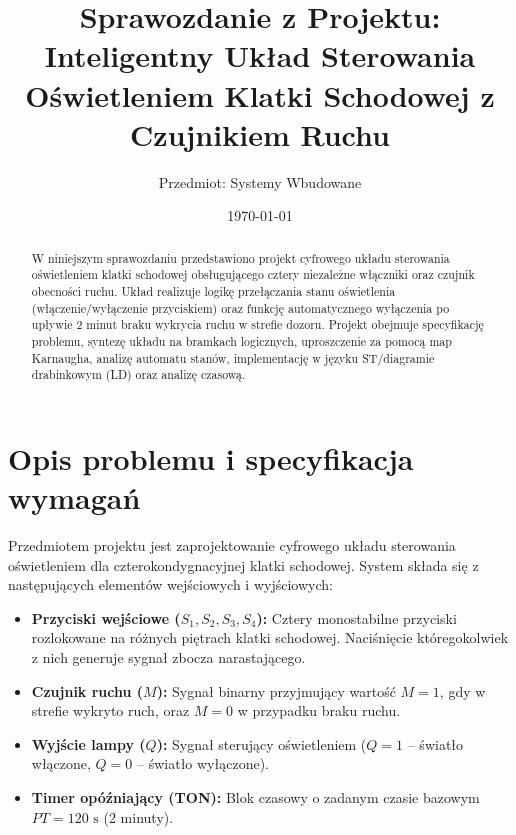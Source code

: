 \documentclass[11pt, a4paper]{article}
\title{Sprawozdanie z Projektu: Inteligentny Układ Sterowania Oświetleniem Klatki Schodowej z Czujnikiem Ruchu}
\author{Przedmiot: Systemy Wbudowane}
\date{\today}
\begin{document}
\maketitle

\begin{abstract}
W niniejszym sprawozdaniu przedstawiono projekt cyfrowego układu sterowania oświetleniem klatki schodowej obsługującego cztery niezależne włączniki oraz czujnik obecności ruchu. Układ realizuje logikę przełączania stanu oświetlenia (włączenie/wyłączenie przyciskiem) oraz funkcję automatycznego wyłączenia po upływie 2 minut braku wykrycia ruchu w strefie dozoru. Projekt obejmuje specyfikację problemu, syntezę układu na bramkach logicznych, uproszczenie za pomocą map Karnaugha, analizę automatu stanów, implementację w języku ST/diagramie drabinkowym (LD) oraz analizę czasową.
\end{abstract}

\section{Opis problemu i specyfikacja wymagań}

Przedmiotem projektu jest zaprojektowanie cyfrowego układu sterowania oświetleniem dla czterokondygnacyjnej klatki schodowej. System składa się z następujących elementów wejściowych i wyjściowych:
\begin{itemize}
    \item \textbf{Przyciski wejściowe ($S_1, S_2, S_3, S_4$):} Cztery monostabilne przyciski rozlokowane na różnych piętrach klatki schodowej. Naciśnięcie któregokolwiek z nich generuje sygnał zbocza narastającego.
    \item \textbf{Czujnik ruchu ($M$):} Sygnał binarny przyjmujący wartość $M = 1$, gdy w strefie wykryto ruch, oraz $M = 0$ w przypadku braku ruchu.
    \item \textbf{Wyjście lampy ($Q$):} Sygnał sterujący oświetleniem ($Q = 1$ -- światło włączone, $Q = 0$ -- światło wyłączone).
    \item \textbf{Timer opóźniający (TON):} Blok czasowy o zadanym czasie bazowym $PT = 120\text{ s}$ (2 minuty).
\end{itemize}
\end{document}

